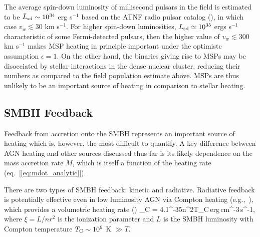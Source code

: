 \documentclass[usenatbib,fleqn]{mn2e}
\begin{document}
The average spin-down luminosity of millisecond pulsars in the field
is estimated to be $\bar{L}_{\rm sd} \sim 10^{34}$ erg s$^{-1}$ based
on the ATNF radio pulsar catalog (\citealt{Manchester+05}), in which
case $v_{w} \lesssim 30$ km s$^{-1}$.  For higher spin-down
luminosities, $L_{\rm sd}\simeq 10^{35}$ ergs s$^{-1}$ characteristic
of some Fermi-detected pulsars, then the higher value of $v_{w}
\lesssim 300$ km s$^{-1}$ makes MSP heating in principle important
under the optimistc assumption $\epsilon = 1$.  On the other hand, the
binaries giving rise to MSPs may be disocciated by stellar
interactions in the dense nuclear cluster, reducing their numbers as
compared to the field population estimate above.  MSPs are thus unlikely to be an important source of heating in comparison to stellar heating.


\subsection{SMBH Feedback}

Feedback from accretion onto the SMBH represents an important source of heating which is, however, the most difficult to quantify.  A key difference between AGN heating and other sources discussed thus far is its likely dependence on the mass accretion rate $\dot{M}$, which is itself a function of the heating rate (eq.~[\ref{eq:mdot_analytic}]).  

There are two types of SMBH feedback: kinetic and radiative.  Radiative feedback is potentially effective even in low luminosity AGN via Compton heating (e.g.,~\citealt{Gan+14}), which provides a volumetric heating rate (\citealt{Gan+14})
\be
{}_{\rm C} = 4.1^{-35}n^{2}\xi T_{\rm C}\,{\rm erg\,cm^{-3}\,s^{-1}},
\ee
where $\xi = L/n r^{2}$ is the ionization parameter and $L$ is the SMBH luminosity with Compton temperature $T_{\rm C} \sim 10^{9}$ K $\gg T$.  
\end{document}
